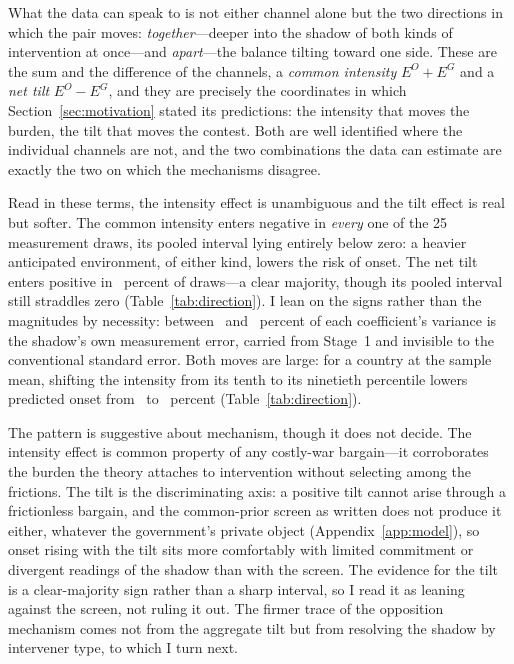 What the data can speak to is not either channel alone but the two directions
in which the pair moves: \emph{together}---deeper into the shadow of both kinds
of intervention at once---and \emph{apart}---the balance tilting toward one
side.  These are the sum and the difference of the channels, a \textit{common
intensity} $E^O + E^G$ and a \textit{net tilt} $E^O - E^G$, and they are
precisely the coordinates in which Section~\ref{sec:motivation} stated its
predictions: the intensity that moves the burden, the tilt that moves the
contest.  Both are well identified where the individual channels are not, and
the two combinations the data can estimate are exactly the two on which the
mechanisms disagree.

Read in these terms, the intensity effect is unambiguous and the tilt effect
is real but softer.  The common intensity enters negative in \emph{every} one
of the 25 measurement draws, its pooled interval lying entirely below zero: a
heavier anticipated environment, of either kind, lowers the risk of onset.  The
net tilt enters positive in \DirTiltFrac\ percent of draws---a clear majority,
though its pooled interval still straddles zero (Table~\ref{tab:direction}).  I lean on the
signs rather than the magnitudes by necessity: between \DirMeasLo\ and
\DirMeasHi\ percent of each coefficient's variance is the shadow's own
measurement error, carried from Stage~1 and invisible to the conventional
standard error.  Both moves are large: for a country at the sample mean,
shifting the intensity from its tenth to its ninetieth percentile lowers
predicted onset from \DirCommonPlo\ to \DirCommonPhi\ percent
(Table~\ref{tab:direction}).

The pattern is suggestive about mechanism, though it does not decide.  The
intensity effect is common property of any costly-war bargain---it corroborates
the burden the theory attaches to intervention without selecting among the
frictions.  The tilt is the discriminating axis: a positive tilt cannot arise
through a frictionless bargain, and the common-prior screen as written does not
produce it either, whatever the government's private object
(Appendix~\ref{app:model}), so onset rising with the tilt sits more comfortably
with limited commitment or divergent readings of the shadow than with the
screen.  The evidence for the tilt is a clear-majority sign rather than a sharp
interval, so I read it as leaning against the screen, not ruling it
out.  The firmer trace of the opposition mechanism comes
not from the aggregate tilt but from resolving the shadow by intervener type,
to which I turn next.

